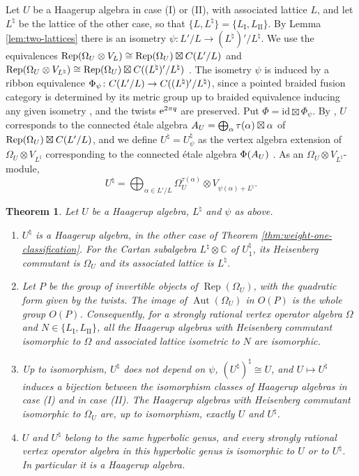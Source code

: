 \documentclass[leqno]{article}
\newcommand{\Cbb}{\ensuremath{\mathbb{C}}}
\let\cal\relax
\newcommand{\cal}{\mathcal}
\newcommand{\co}{\colon}
\newcommand{\ot}{\otimes}
\let\i\relax
\newcommand{\i}{\mathrm{i}}
\newcommand{\e}{\mathrm{e}}
\DeclareMathOperator{\Rep}{Rep}
\newtheorem{thm}{Theorem}[section]
\numberwithin{equation}{section}
\begin{document}
Let $U$ be a Haagerup algebra in case (I) or (II), with associated lattice $L$, and let $L^\natural$ be the lattice of the other case, so that $\{L,L^\natural\} = \{L_{\mathrm I},L_{\mathrm{II}}\}$. By Lemma \ref{lem:two-lattices} there is an isometry $\psi \co L'/L \to (L^\natural)'/L^\natural$. We use the equivalences $\Rep(\Omega_U \ot V_L) \cong \Rep(\Omega_U) \boxtimes \cal C(L'/L)$ and $\Rep(\Omega_U \ot V_{L^\natural}) \cong \Rep(\Omega_U) \boxtimes \cal C((L^\natural)'/L^\natural)$ \cite{FHL93,CKM22}. The isometry $\psi$ is induced by a ribbon equivalence $\Phi_\psi \co \cal C(L'/L) \to \cal C((L^\natural)'/L^\natural)$, since a pointed braided fusion category is determined by its metric group up to braided equivalence inducing any given isometry \cite[Section 8.4]{EGNO15}, and the twists $\e^{2\pi\i q}$ are preserved. Put $\Phi = \mathrm{id} \boxtimes \Phi_\psi$. By \cite{HKL15}, $U$ corresponds to the connected étale algebra $\cal A_U = \bigoplus_\alpha \tau(\alpha) \boxtimes \alpha$ of $\Rep(\Omega_U) \boxtimes \cal C(L'/L)$, and we define $U^\natural = U^\natural_\psi$ as the vertex algebra extension of $\Omega_U \ot V_{L^\natural}$ corresponding to the connected étale algebra $\Phi(\cal A_U)$ \cite{HKL15,CKM22}. As an $\Omega_U \ot V_{L^\natural}$-module,
\[
U^\natural = \bigoplus_{\alpha \in L'/L} \Omega_U^{\tau(\alpha)} \ot V_{\psi(\alpha)+L^\natural}.
\]

\begin{thm}
\label{thm:twin}
Let $U$ be a Haagerup algebra, $L^\natural$ and $\psi$ as above.
\begin{enumerate}
\item $U^\natural$ is a Haagerup algebra, in the other case of Theorem \ref{thm:weight-one-classification}. For the Cartan subalgebra $L^\natural \ot \Cbb$ of $U^\natural_1$, its Heisenberg commutant is $\Omega_U$ and its associated lattice is $L^\natural$.
\item Let $P$ be the group of invertible objects of $\Rep(\Omega_U)$, with the quadratic form given by the twists. The image of $\operatorname{Aut}(\Omega_U)$ in $O(P)$ is the whole group $O(P)$. Consequently, for a strongly rational vertex operator algebra $\Omega$ and $N \in \{L_{\mathrm I},L_{\mathrm{II}}\}$, all the Haagerup algebras with Heisenberg commutant isomorphic to $\Omega$ and associated lattice isometric to $N$ are isomorphic.
\item Up to isomorphism, $U^\natural$ does not depend on $\psi$, $(U^\natural)^\natural \cong U$, and $U \mapsto U^\natural$ induces a bijection between the isomorphism classes of Haagerup algebras in case (I) and in case (II). The Haagerup algebras with Heisenberg commutant isomorphic to $\Omega_U$ are, up to isomorphism, exactly $U$ and $U^\natural$.
\item $U$ and $U^\natural$ belong to the same hyperbolic genus, and every strongly rational vertex operator algebra in this hyperbolic genus is isomorphic to $U$ or to $U^\natural$. In particular it is a Haagerup algebra.
\end{enumerate}
\end{thm}
\end{document}
